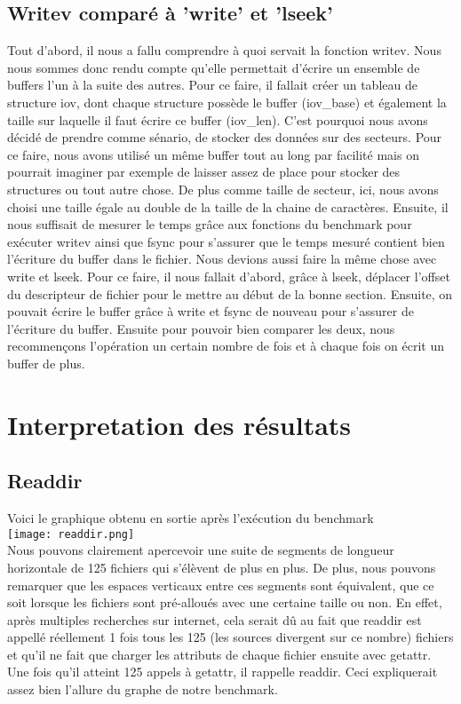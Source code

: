 \documentclass[11pt, oneside]{article}
\begin{document}
\begin{multicols}{2}
\subsection{Writev comparé à 'write' et 'lseek'}
Tout d'abord, il nous a fallu comprendre à quoi servait la fonction writev. Nous nous sommes donc rendu compte qu'elle permettait d'écrire un ensemble de buffers l'un à la suite des autres. Pour ce faire, il fallait créer un tableau de structure iov, dont chaque structure possède le buffer (iov\_base) et également la taille sur laquelle il faut écrire ce buffer (iov\_len). C'est pourquoi nous avons décidé de prendre comme sénario, de stocker des données sur des secteurs. Pour ce faire, nous avons utilisé un même buffer tout au long par facilité mais on pourrait imaginer par exemple de laisser assez de place pour stocker des structures ou tout autre chose. De plus comme taille de secteur, ici, nous avons choisi une taille égale au double de la taille de la chaine de caractères.
Ensuite, il nous suffisait de mesurer le temps grâce aux fonctions du benchmark pour exécuter writev ainsi que fsync pour s'assurer que le temps mesuré contient bien l'écriture du buffer dans le fichier.
Nous devions aussi faire la même chose avec write et lseek. Pour ce faire, il nous fallait d'abord, grâce à lseek, déplacer l'offset du descripteur de fichier pour le mettre au début de la bonne section. Ensuite, on pouvait écrire le buffer grâce à write et fsync de nouveau pour s'assurer de l'écriture du buffer.
Ensuite pour pouvoir bien comparer les deux, nous recommençons l'opération un certain nombre de fois et à chaque fois on écrit un buffer de plus.

\section{Interpretation des résultats}
\subsection{Readdir}
Voici le graphique obtenu en sortie après l'exécution du benchmark \\
\texttt{[image: readdir.png]}
\\
Nous pouvons clairement apercevoir une suite de segments de longueur horizontale de 125 fichiers qui s'élèvent de plus en plus. 
De plus, nous pouvons remarquer que les espaces verticaux entre ces segments sont équivalent, que ce soit lorsque les fichiers sont pré-alloués avec une certaine taille ou non. 
En effet, après multiples recherches sur internet, cela serait dû au fait que readdir est appellé réellement 1 fois tous les 125 (les sources divergent sur ce nombre) fichiers et
qu'il ne fait que charger les attributs de chaque fichier ensuite avec getattr. Une fois qu'il atteint 125 appels à getattr, il rappelle readdir. Ceci expliquerait assez bien l'allure du graphe de notre benchmark.


\end{multicols}
\end{document}
